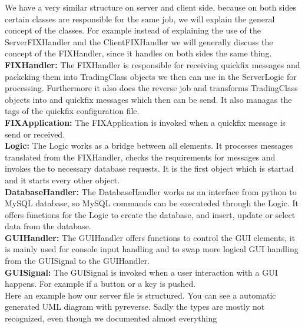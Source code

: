 \documentclass[a4paper, 11pt]{article}
\begin{document}
We have a very similar structure on server and client side, because on both sides certain classes are responsible for the same job,
we will explain the general concept of the classes. For example instead of explaining the use of the ServerFIXHandler and the ClientFIXHandler
we will generally discuss the concept of the FIXHandler, since it handles on both sides the same thing.\\
\textbf{FIXHandler:} The FIXHandler is responsible for receiving quickfix messages and packcking them into TradingClass objects 
we then can use in the ServerLogic for processing. Furthermore it also does the reverse job and transforms TradingClass objects into
and quickfix messages which then can be send. It also managas the tags of the quickfix configuration file. \\
\textbf{FIXApplication:} The FIXApplication is invoked when a quickfix message is send or received. \\
\textbf{Logic:} The Logic works as a bridge between all elements. It processes messages translated from the FIXHandler, checks the 
requirements for messages and invokes the to necessary database requests. It is the first object which is startad and it starts every other object. \\
\textbf{DatabaseHandler:} The DatabaseHandler works as an interface from python to MySQL database, so MySQL commands can be executeded through
the Logic. It offers functions for the Logic to create the database, and insert, update or select data from the database. \\
\textbf{GUIHandler:} The GUIHandler offers functions to control the GUI elements, it is mainly used for console input handling and to swap more
logical GUI handling from the GUISignal to the GUIHandler. \\
\textbf{GUISignal:} The GUISignal is invoked when a user interaction with a GUI happens. For example if a button or a key is pushed. \\

Here an example how our server file is structured. You can see a automatic generated UML diagram with pyreverse. Sadly
the types are mostly not recognized, even though we documented almost everything
\end{document}
